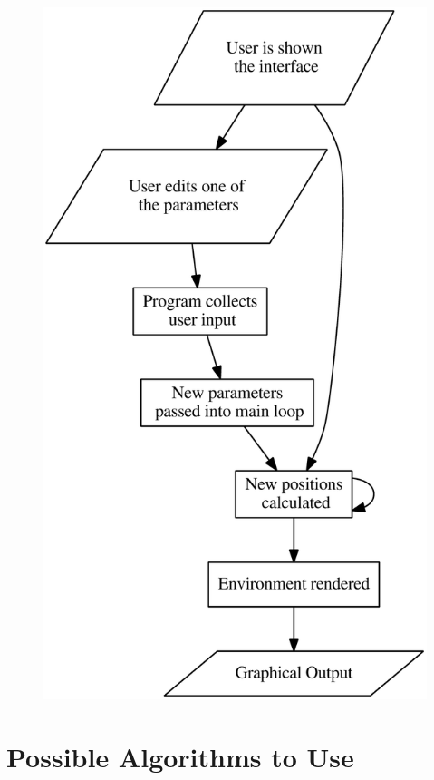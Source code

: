 \begin{figure}[h]
	\includegraphics[scale=0.23]{./img/flow.eps}
	\label{fig:flow}	
\end{figure}

\section{Possible Algorithms to Use}


